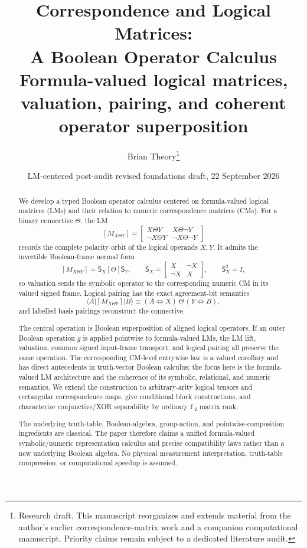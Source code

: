 \documentclass[11pt]{article}
\title{Correspondence and Logical Matrices:\\A Boolean Operator Calculus\\[0.4em]
\large Formula-valued logical matrices, valuation, pairing, and coherent operator superposition}
\author{Brian Theory\thanks{Research draft. This manuscript reorganizes and extends material from the author's earlier correspondence-matrix work and a companion computational manuscript. Priority claims remain subject to a dedicated literature audit.}}
\date{LM-centered post-audit revised foundations draft, 22 September 2026}
\theoremstyle{definition}
\theoremstyle{remark}
\newcommand{\F}{\mathbb F}
\begin{document}
\maketitle

\begin{abstract}
We develop a typed Boolean operator calculus centered on formula-valued logical matrices (LMs) and their relation to numeric correspondence matrices (CMs).  For a binary connective $\Theta$, the LM
\[
 [M_{X\Theta Y}]
 =\begin{bmatrix}
 X\Theta Y & X\Theta\neg Y\\
 \neg X\Theta Y & \neg X\Theta\neg Y
 \end{bmatrix}
\]
records the complete polarity orbit of the logical operands $X,Y$.  It admits the invertible Boolean-frame normal form
\[
 [M_{X\Theta Y}]=\mathsf S_X[\Theta]\mathsf S_Y,
 \qquad
 \mathsf S_X=\begin{bmatrix}X&\neg X\\ \neg X&X\end{bmatrix},
 \qquad \mathsf S_X^2=I,
\]
so valuation sends the symbolic operator to the corresponding numeric CM in its valued signed frame.  Logical pairing has the exact agreement-bit semantics
\[
 \langle A|[M_{X\Theta Y}]|B\rangle
 \equiv (A\Leftrightarrow X)\,\Theta\,(Y\Leftrightarrow B),
\]
and labelled basis pairings reconstruct the connective.

The central operation is Boolean superposition of aligned logical operators.  If an outer Boolean operation $g$ is applied pointwise to formula-valued LMs, the LM lift, valuation, common signed input-frame transport, and logical pairing all preserve the same operation.  The corresponding CM-level entrywise law is a valued corollary and has direct antecedents in truth-vector Boolean calculus; the focus here is the formula-valued LM architecture and the coherence of its symbolic, relational, and numeric semantics.  We extend the construction to arbitrary-arity logical tensors and rectangular correspondence maps, give conditional block constructions, and characterize conjunctive/XOR separability by ordinary $\F_2$ matrix rank.

The underlying truth-table, Boolean-algebra, group-action, and pointwise-composition ingredients are classical.  The paper therefore claims a unified formula-valued symbolic/numeric representation calculus and precise compatibility laws rather than a new underlying Boolean algebra.  No physical measurement interpretation, truth-table compression, or computational speedup is assumed.
\end{abstract}
\end{document}
